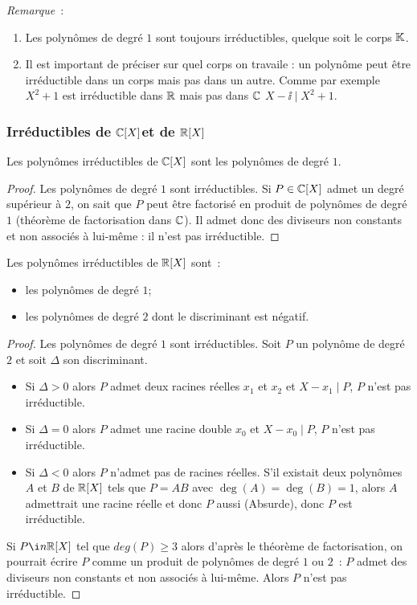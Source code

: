 \emph{Remarque}~:
\begin{enumerate}
\item Les polynômes de degré $1$ sont toujours irréductibles, quelque soit le corps $\mathbb{K}$.
\item Il est important de préciser sur quel corps on travaile : un polynôme peut être irréductible dans un corps mais pas dans un autre. Comme par exemple $X^2+1$ est irréductible dans $\mathbb{R}$ mais pas dans $\mathbb{C}$ $X-\ii\mid{}X^2+1$.
\end{enumerate}

\subsubsection{Irréductibles de $\mathbb{C}[X]$et de $\mathbb{R}[X]$}

\begin{prop}
  Les polynômes irréductibles de $\mathbb{C}[X]$ sont les polynômes de degré $1$.
\end{prop}
\begin{proof}
  Les polynômes de degré $1$ sont irréductibles. Si $P\in \mathbb{C}[X]$ admet un degré supérieur à $2$, on sait que $P$ peut être factorisé en produit de polynômes de degré $1$ (théorème de factorisation dans $\mathbb{C}$). Il admet donc des diviseurs non constants et non associés à lui-même : il n'est pas irréductible.
\end{proof}

\begin{prop}
  Les polynômes irréductibles de $\mathbb{R}[X]$ sont~:
  \begin{itemize}
  \item les polynômes de degré $1$;
  \item les polynômes de degré $2$ dont le discriminant est négatif.
  \end{itemize}
\end{prop}
\begin{proof}
  Les polynômes de degré $1$ sont irréductibles. Soit $P$ un polynôme de degré $2$ et soit $\Delta$ son discriminant.
  \begin{itemize}
  \item Si $\Delta>0$ alors $P$ admet deux racines réelles $x_1$ et $x_2$ et $X-x_1\mid{}P$, $P$ n'est pas irréductible.
  \item Si $\Delta=0$ alors $P$ admet une racine double $x_0$ et $X-x_0\mid{}P$, $P$ n'est pas irréductible.
  \item Si $\Delta <0$ alors $P$ n'admet pas de racines réelles. S'il existait deux polynômes $A$ et $B$ de $\mathbb{R}[X]$ tels que $P=AB$ avec $\deg(A) = \deg(B)=1$, alors $A$ admettrait une racine réelle et donc $P$ aussi (Absurde), donc $P$ est irréductible.
  \end{itemize}
  Si $P \i n \R[X]$ tel que $deg(P)\geqslant 3$ alors d'après le théorème de factorisation, on pourrait écrire $P$ comme un produit de polynômes de degré $1$ ou $2$~: $P$ admet des diviseurs non constants et non associés à lui-même. Alors $P$ n'est pas irréductible.
\end{proof}


